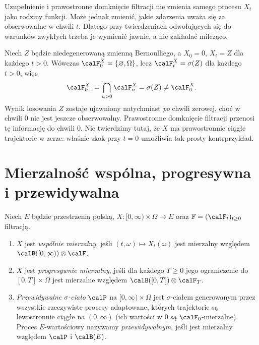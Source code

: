 \begin{uwaga}
Uzupełnienie i prawostronne domknięcie filtracji
nie zmienia samego procesu $X_t$ jako rodziny funkcji.
Może jednak zmienić, jakie zdarzenia uważa się za
obserwowalne w chwili $t$. Dlatego przy twierdzeniach
odwołujących się do warunków zwykłych trzeba je
wymienić jawnie, a nie zakładać milcząco.
\end{uwaga}


\begin{przyklad}
Niech $Z$ będzie niedegenerowaną zmienną Bernoulliego,
a $X_0=0$, $X_t=Z$ dla każdego $t>0$.
Wówczas $\calF_0^X=\{\varnothing,\Omega\}$, lecz
$\calF_t^X=\sigma(Z)$ dla każdego $t>0$, więc
\[
\calF_{0+}^X=\bigcap_{u>0}\calF_u^X
=\sigma(Z)\ne\calF_0^X.
\]
Wynik losowania $Z$ zostaje ujawniony natychmiast
\emph{po} chwili zerowej, choć w chwili $0$ nie jest
jeszcze obserwowalny. Prawostronne domknięcie filtracji
przenosi tę informację do chwili $0$.
Nie twierdzimy tutaj, że $X$ ma prawostronnie ciągłe
trajektorie w zerze: właśnie skok przy $t=0$ umożliwia
tak prosty kontrprzykład.
\end{przyklad}

\section{Mierzalność wspólna, progresywna i przewidywalna}
\begin{definicja}
Niech $E$ będzie przestrzenią polską,
$X:[0,\infty)\times\Omega\to E$ oraz
$\mathbb F=(\calF_t)_{t\ge0}$ filtracją.
\begin{enumerate}
\item $X$ jest \emph{wspólnie mierzalny}, jeśli
$(t,\omega)\mapsto X_t(\omega)$ jest mierzalny względem
$\calB([0,\infty))\otimes\calF$.
\item $X$ jest \emph{progresywnie mierzalny}, jeśli dla każdego
$T\ge0$ jego ograniczenie do $[0,T]\times\Omega$
jest mierzalne względem
$\calB([0,T])\otimes\calF_T$.
\item \emph{Przewidywalne $\sigma$-ciało} $\calP$ na
$[0,\infty)\times\Omega$ jest $\sigma$-ciałem generowanym
przez wszystkie rzeczywiste procesy adaptowane,
których trajektorie są lewostronnie ciągłe na $(0,\infty)$
(ich wartości w $0$ są $\calF_0$-mierzalne).
Proces $E$-wartościowy nazywamy \emph{przewidywalnym},
jeśli jest mierzalny względem $\calP$ i $\calB(E)$.
\end{enumerate}
\end{definicja}

